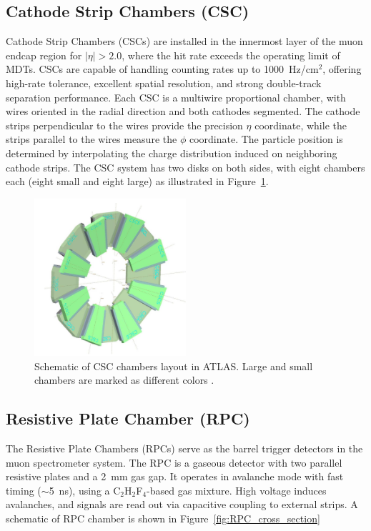 \subsection{Cathode Strip Chambers (CSC)}
Cathode Strip Chambers (CSCs) are installed in the innermost layer of the muon endcap region for $|\eta| > 2.0$, where the hit rate exceeds the operating limit of MDTs. CSCs are capable of handling counting rates up to 1000~Hz/cm$^2$, offering high-rate tolerance, excellent spatial resolution, and strong double-track separation performance. Each CSC is a multiwire proportional chamber, with wires oriented in the radial direction and both cathodes segmented. The cathode strips perpendicular to the wires provide the precision $\eta$ coordinate, while the strips parallel to the wires measure the $\phi$ coordinate. The particle position is determined by interpolating the charge distribution induced on neighboring cathode strips. The CSC system has two disks on both sides, with eight chambers each (eight small and eight large) as illustrated in Figure~\ref{fig:CSC_layout}.

\begin{figure}[htbp]
  \centering
  \includegraphics[width=0.5\textwidth]{figs/chapter2/CSC_layout.png}
  \caption{Schematic of CSC chambers layout in ATLAS. Large and small chambers are marked as different colors \cite{ATLASDetector2008}.}
  \label{fig:CSC_layout}
\end{figure}

\subsection{Resistive Plate Chamber (RPC)}
The Resistive Plate Chambers (RPCs) serve as the barrel trigger detectors in the muon spectrometer system. The RPC is a gaseous detector with two parallel resistive plates and a 2~mm gas gap. It operates in avalanche mode with fast timing ($\sim$5~ns), using a C$_2$H$_2$F$_4$-based gas mixture. High voltage induces avalanches, and signals are read out via capacitive coupling to external strips. A schematic of RPC chamber is shown in Figure~\ref{fig:RPC_cross_section}

